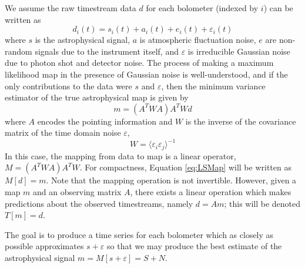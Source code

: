 \documentclass[12pt,preprint]{aastex}
\newcommand{\epsi}{\varepsilon}
\begin{document}
We assume the raw timestream data $d$ for each bolometer (indexed by
$i$) can be written as
\begin{equation}
d_i(t) = s_i(t)+a_i(t)+e_i(t)+\epsi_i(t)
\end{equation}
where $s$ is the astrophysical signal, $a$ is atmospheric fluctuation
noise, $e$ are non-random signals due to the instrument itself, and
$\epsi$ is irreducible Gaussian noise due to photon shot and detector
noise.  The process of making a maximum likelihood map in the presence
of Gaussian noise is well-understood, and if the only contributions to
the data were $s$ and $\epsi$, then the minimum variance estimator of
the true astrophysical map is given by
\begin{equation}
\label{eq:LSMap}
m = (A^T W A) A^T W d
\end{equation}
where $A$ encodes the pointing information and $W$ is the inverse of
the covariance matrix of the time domain noise $\epsi$,
\begin{equation}
W = {\langle \epsi_i \epsi_j \rangle}^{-1}
\end{equation}
In this case, the mapping from data to map is a linear operator, $M
=(A^T W A) A^T W$.  For compactness, Equation \ref{eq:LSMap} will be
written as $M[d] = m$.  Note that the mapping operation is not
invertible.  However, given a map $m$ and an observing matrix $A$,
there exists a linear operation which makes predictions about the
observed timestreams, namely $d = A m$; this will be denoted $T[m] =
d$.

The goal is to produce a time series for each bolometer which as
closely as possible approximates $s + \epsi$ so that we may produce
the best estimate of the astrophysical signal $m = M[s+\epsi] = S + N$.
\end{document}
